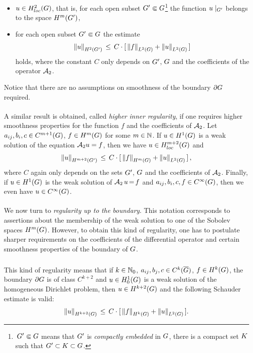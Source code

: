 \documentclass[11pt,twoside]{article}
\begin{document}
\begin{itemize}
\item[1.]
$u \in H_{loc}^2(G)$,
that is,
for each open subset $G' \Subset G$\footnote{
\,$G' \Subset G$ means
that $G'$ is \textit{compactly embedded} in $G$,
{\ie}
there is a compact set ${K}$ such that $G' \subset {K} \subset G$.}
the function $u \mid_{G'}$ belongs to the space $H^m(G')$,

\item[2.]
for each open subset $G' \Subset G$ the estimate
\[
\left\lVert u \right\rVert_{H^2(G')} \, \leq \,
C \cdot [\,\left\lVert f \right\rVert_{L^2(G)} + \left\lVert u \right\rVert_{L^2(G)}\,]
\]
holds,
where the constant $C$ only depends on $G'$, $G$
and the coefficients of the operator ${\mathcal{A}}_2$.
\end{itemize}

Notice that
there are no assumptions on smoothness of the boundary $\partial G$ required.

\paragraph*{} %
A similar result is obtained,
called \textit{higher inner regularity},
if one requires higher smoothness properties for the function $f$ and
the coefficients of ${\mathcal{A}}_2$.
Let $a_{ij}, b_i, c \in C^{m+1}(G)$, $f \in H^m(G)$ for some $m \in {\mathbb{N}}$.
If $u \in H^1(G)$ is a weak solution of the equation ${\mathcal{A}}_2 u =f$,
then we have $u \in H_{loc}^{m+2}(G)$ and
\[
\left\lVert u \right\rVert_{H^{m+2}(G')} \, \leq \,
C \cdot [\, \left\lVert f \right\rVert_{H^m(G)} + \left\lVert u \right\rVert_{L^2(G)} \,] \,,
\]
where $C$ again only depends on the sets $G'$, $G$
and the coefficients of ${\mathcal{A}}_2$.
Finally,
if $u \in H^1(G)$ is the weak solution of ${\mathcal{A}}_2 \, u {\,=\,} f$
and $a_{ij}, b_i, c, f \in C^{\infty}(G)$,
then we even have $u \in C^{\infty}(G)$.

\paragraph*{} %
We now turn to \textit{regularity up to the boundary}.
This notation corresponds to assertions about the membership
of the weak solution to one of the Sobolev spaces $H^m(G)$.
However,
to obtain this kind of regularity,
one has to postulate sharper requirements
on the coefficients of the differential operator
and certain smoothness properties of the boundary of $G$.

\subparagraph*{}
This kind of regularity means
that if $k \in {\mathbb{N}}_0$,
$a_{ij}, b_j, c \in C^k(\overline{G})$,
$f \in H^k(G)$,
the boundary $\partial G$ is of class $C^{k+2}$ and
$u \in H_0^{1}(G)$ is a weak solution of the homogeneous Dirichlet problem,
then $u \in H^{k+2}(G)$ and the following Schauder estimate is valid:
\[
\left\lVert u \right\rVert_{H^{k+2}(G)} \, \leq \,
C \cdot [\, \left\lVert f \right\rVert_{H^k(G)} + \left\lVert u \right\rVert_{L^2(G)} \,].
\]
\end{document}
